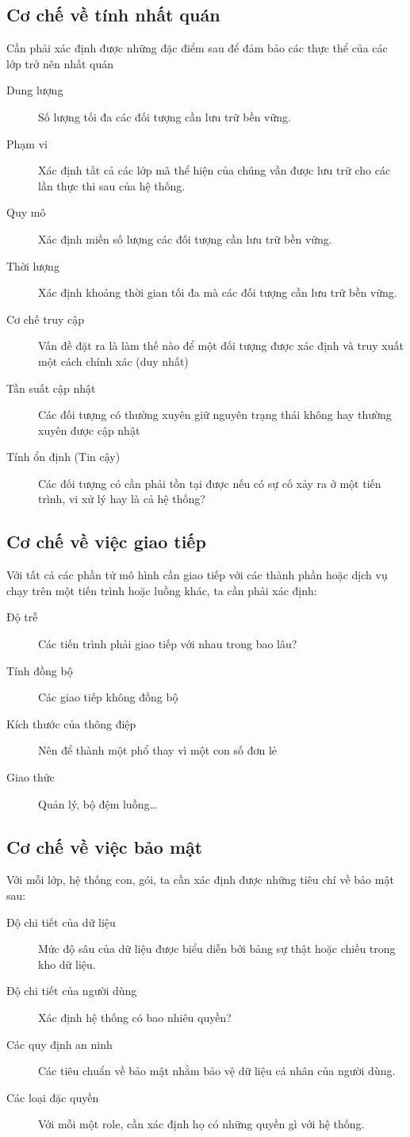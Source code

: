 \documentclass[./../main_file.tex]{subfiles}
\begin{document}
	\subsection{Cơ chế về tính nhất quán}
	Cần phải xác định được những đặc điểm sau để đảm bảo các thực thể của các lớp trở nên nhất quán
	\begin{description}
		\item[Dung lượng] Số lượng tối đa các đối tượng cần lưu trữ bền vững. 
		\item[Phạm vi] Xác định tất cả các lớp mà thể hiện của chúng vần được lưu trữ cho các lần thực thi sau của hệ thống.
		\item[Quy mô] Xác định miền số lượng các đối tượng cần lưu trữ bền vững.
		\item[Thời lượng] Xác định khoảng thời gian tối đa mà các đối tượng cần lưu trữ bền vững.
		\item[Cơ chế truy cập] Vấn đề đặt ra là làm thế nào để một đối tượng được xác định và truy xuất một cách chính xác (duy nhất)
		\item[Tần suất cập nhật] Các đối tượng có thường xuyên giữ nguyên trạng thái không hay thường xuyên được cập nhật
		\item[Tính ổn định (Tin cậy)] Các đối tượng có cần phải tồn tại được nếu có sự cố xảy ra ở một tiến trình, vi xử lý hay là cả hệ thống?
	\end{description}
	
	\subsection{Cơ chế về việc giao tiếp} 
	Với tất cả các phần tử mô hình cần giao tiếp với các thành phần hoặc dịch vụ chạy trên một tiến trình hoặc luồng khác, ta cần phải xác định:
	\begin{description}
		\item[Độ trễ] Các tiến trình phải giao tiếp với nhau trong bao lâu?
		\item[Tính đồng bộ] Các giao tiếp không đồng bộ
		\item[Kích thước của thông điệp] Nên để thành một phổ thay vì một con số đơn lẻ
		\item[Giao thức] Quản lý, bộ đệm luồng…
	\end{description}
	
	\subsection{Cơ chế về việc bảo mật} 
	Với mỗi lớp, hệ thống con, gói, ta cần xác định được những tiêu chí về bảo mật sau:
	\begin{description}
		\item[Độ chi tiết của dữ liệu] Mức độ sâu của dữ liệu được biểu diễn bởi bảng sự thật hoặc chiều trong kho dữ liệu.
		\item[Độ chi tiết của người dùng] Xác định hệ thống có bao nhiêu quyền?
		\item[Các quy định an ninh] Các tiêu chuẩn về bảo mật nhằm bảo vệ dữ liệu cá nhân của người dùng.
		\item[Các loại đặc quyền] Với mỗi một role, cần xác định họ có những quyền gì với hệ thống.
	\end{description}
	
\end{document}
